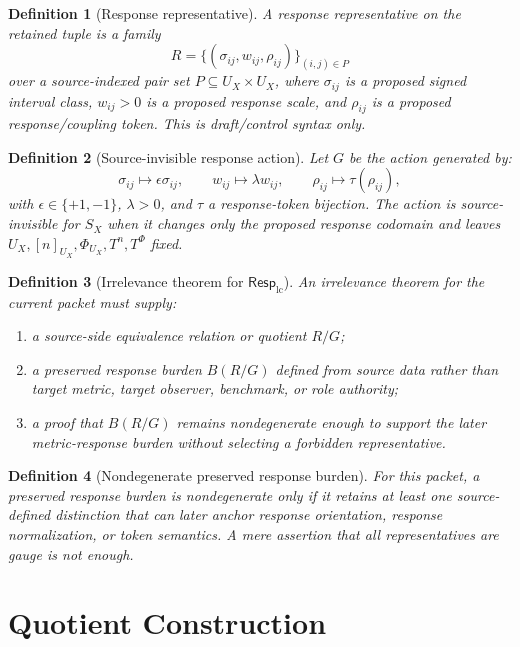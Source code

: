 \documentclass[11pt]{article}
\newcommand{\RespLC}{\mathsf{Resp}_{\mathrm{lc}}}
\newtheorem{definition}{Definition}
\begin{document}
\begin{definition}[Response representative]
A response representative on the retained tuple is a family
\[
    R=\{(\sigma_{ij},w_{ij},\rho_{ij})\}_{(i,j)\in P}
\]
over a source-indexed pair set \(P\subseteq U_X\times U_X\), where
\(\sigma_{ij}\) is a proposed signed interval class,
\(w_{ij}>0\) is a proposed response scale, and \(\rho_{ij}\) is a
proposed response/coupling token. This is draft/control syntax only.
\end{definition}

\begin{definition}[Source-invisible response action]
Let \(G\) be the action generated by:
\[
    \sigma_{ij}\mapsto \epsilon \sigma_{ij},\qquad
    w_{ij}\mapsto \lambda w_{ij},\qquad
    \rho_{ij}\mapsto \tau(\rho_{ij}),
\]
with \(\epsilon\in\{+1,-1\}\), \(\lambda>0\), and \(\tau\) a
response-token bijection. The action is source-invisible for \(S_X\)
when it changes only the proposed response codomain and leaves
\(U_X,[n]_{U_X},\Phi_{U_X},T^n,T^\Phi\) fixed.
\end{definition}

\begin{definition}[Irrelevance theorem for \(\RespLC\)]
An irrelevance theorem for the current packet must supply:
\begin{enumerate}
    \item a source-side equivalence relation or quotient \(R/G\);
    \item a preserved response burden \(B(R/G)\) defined from source
    data rather than target metric, target observer, benchmark, or
    role authority;
    \item a proof that \(B(R/G)\) remains nondegenerate enough to
    support the later metric-response burden without selecting a
    forbidden representative.
\end{enumerate}
\end{definition}

\begin{definition}[Nondegenerate preserved response burden]
For this packet, a preserved response burden is nondegenerate only if
it retains at least one source-defined distinction that can later
anchor response orientation, response normalization, or token
semantics. A mere assertion that all representatives are gauge is not
enough.
\end{definition}

\section{Quotient Construction}
\end{document}
